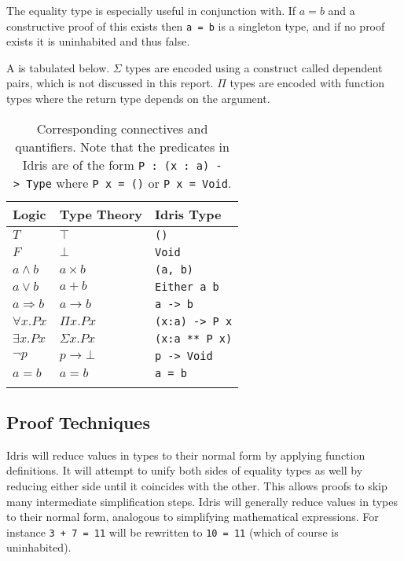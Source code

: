 \documentclass[]{report}
\begin{document}
The equality type is especially useful in conjunction with. If $a=b$ and a constructive proof of this exists then \texttt{a = b} is a singleton type, and if no proof exists it is uninhabited and thus false.

A  is tabulated below.  $\Sigma$ types are encoded using a construct called dependent pairs, which is not discussed in this report. $\Pi$ types are encoded with function types where the return type depends on the argument.

\begin{longtable}[]{@{}lll@{}}
\toprule
Logic & Type Theory & Idris
Type \\
\midrule
\endhead
{\(T\)} & {\(\top\)} & \texttt{()} \\
{\(F\)} & {\(\bot\)} & \texttt{Void} \\
{\(a \land b\)} & {\(a \times b\)} & \texttt{(a,\ b)} \\
{\(a \vee b\)} & {\(a + b\)} & \texttt{Either\ a\ b} \\
{\(a\Rightarrow b\)} & {\(a \rightarrow b\)} &
\texttt{a\ -\textgreater{}\ b} \\
{\(\forall x.Px\)} & {\(\Pi x.Px\)} &
\texttt{(x:a)\ -\textgreater{}\ P\ x} \\
{\(\exists x.Px\)} & {\(\Sigma x.Px\)} & \texttt{(x:a\ **\ P\ x)} \\
{\(\neg p\)} & {\(p \rightarrow \bot\)} &
\texttt{p\ -\textgreater{}\ Void} \\
{$a=b$} & {$a=b$} & {\texttt{a = b}} \\
\bottomrule
\caption{Corresponding connectives and quantifiers. Note that the predicates in Idris are of the form \texttt{P\ :\ (x\ :\ a)\ -\textgreater{}\ Type} where \texttt{P\ x\ =\ ()} or \texttt{P\ x\ =\ Void}.}
\end{longtable}

\subsection{Proof Techniques}

Idris will reduce values in types to their normal form by applying function definitions. It will attempt to unify both sides of equality types as well by reducing either side until it coincides with the other. This allows proofs to skip many intermediate simplification steps. Idris will generally reduce values in types to their normal form, analogous to simplifying mathematical expressions. For instance \texttt{3 + 7 = 11} will be rewritten to \texttt{10 = 11} (which of course is uninhabited).
\end{document}
